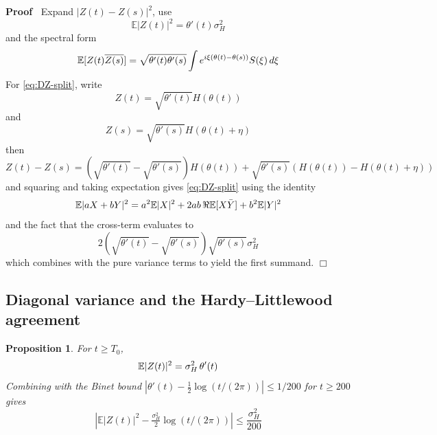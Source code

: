 \documentclass{article}
\newenvironment{proof}{\noindent\textbf{Proof\ }}{\hspace*{\fill}$\Box$\medskip}
\newtheorem{proposition}{Proposition}
\begin{document}
\begin{proof}
  Expand $|Z (t) - Z (s) |^2$, use
  \begin{equation}
    \mathbb{E} |Z (t) |^2 = \theta' (t) \sigma_H^2
  \end{equation}
  and the spectral form
  \begin{equation}
    \mathbb{E} [Z (t) \overline{Z (s)}] = \sqrt{\theta' (t) \theta' (s)}  \int
    e^{i \xi (\theta (t) - \theta (s))} S (\xi)  \hspace{0.17em} d \xi
  \end{equation}
  For \eqref{eq:DZ-split}, write
  \begin{equation}
    Z (t) = \sqrt{\theta' (t)} H (\theta (t))
  \end{equation}
  and
  \begin{equation}
    Z (s) = \sqrt{\theta' (s)} H (\theta (t) + \eta)
  \end{equation}
  then
  \begin{equation}
    Z (t) - Z (s) = \left( \sqrt{\theta' (t)} - \sqrt{\theta' (s)} \right) H
    (\theta (t)) + \sqrt{\theta' (s)}  (H (\theta (t)) - H (\theta (t) +
    \eta))
  \end{equation}
  and squaring and taking expectation gives \eqref{eq:DZ-split} using the
  identity
  \begin{equation}
    \mathbb{E} |aX + bY|^2 = a^2 \mathbb{E}|X|^2 + 2 ab \hspace{0.17em} \Re
    \mathbb{E} [X \bar{Y}] + b^2 \mathbb{E} |Y|^2
  \end{equation}
  and the fact that the cross-term evaluates to
  \begin{equation}
    2 (\sqrt{\theta' (t)} - \sqrt{\theta' (s)})  \sqrt{\theta' (s)} \sigma_H^2
  \end{equation}
  which combines with the pure variance terms to yield the first summand.
\end{proof}

\subsection{Diagonal variance and the Hardy--Littlewood agreement}

\begin{proposition}
  \label{prop:var-diag}For $t \ge T_0$,
  \begin{equation}
    \mathbb{E} |Z (t) |^2 = \sigma_H^2  \hspace{0.17em} \theta' (t)
    \label{eq:var-diag}
  \end{equation}
  Combining with the Binet bound $| \theta' (t) - \tfrac{1}{2} \log (t / (2
  \pi)) | \le 1 / 200$ for $t \ge 200$ gives
  \begin{equation}
    \left| \mathbb{E}|Z (t) |^2 - \tfrac{\sigma_H^2}{2} \log (t / (2 \pi))
    \right| \le \frac{\sigma_H^2}{200} \label{eq:var-diag-log}
  \end{equation}
\end{proposition}
\end{document}
